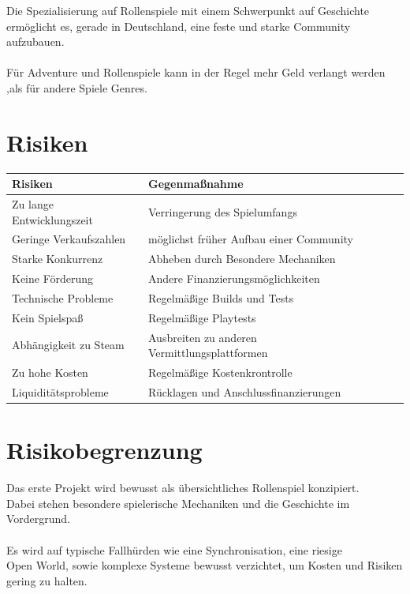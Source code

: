 \documentclass[envcountsame,envcountchap deutsch]{i-studis}
\begin{document}
Die Spezialisierung auf Rollenspiele mit einem Schwerpunkt auf Geschichte ermöglicht es, gerade in Deutschland, eine feste und starke Community aufzubauen. \\\\

Für Adventure und Rollenspiele kann in der Regel mehr Geld verlangt werden ,als für andere Spiele Genres.

\pagebreak
\section{Risiken}
\begin{table}[ht]
	\centering
	\begin{tabular}{|p{5cm}|p{8cm}|p{3cm}|p{3cm}|}
		\hline
		\textbf{Risiken}  & \textbf{Gegenmaßnahme}  \\ \hline
		Zu lange Entwicklungszeit  & Verringerung des Spielumfangs  \\ \hline
		Geringe Verkaufszahlen & möglichst früher Aufbau einer Community  \\ \hline
		Starke Konkurrenz  & Abheben durch Besondere Mechaniken\\ \hline
		Keine Förderung  & Andere Finanzierungsmöglichkeiten \\ \hline
		Technische Probleme  & Regelmäßige Builds und Tests\\ \hline
		Kein Spielspaß  & Regelmäßige Playtests\\ \hline
		Abhängigkeit zu Steam  & Ausbreiten zu anderen Vermittlungsplattformen\\ \hline
		Zu hohe Kosten  & Regelmäßige Kostenkrontrolle\\ \hline
		Liquiditätsprobleme  & Rücklagen und Anschlussfinanzierungen\\ \hline
	\end{tabular}
\end{table}

\section{Risikobegrenzung}

Das erste Projekt wird bewusst als übersichtliches Rollenspiel konzipiert.\\
Dabei stehen besondere spielerische Mechaniken und die Geschichte im Vordergrund.\\
\\
Es wird auf typische Fallhürden wie eine Synchronisation, eine riesige \\ Open World, sowie
komplexe Systeme bewusst verzichtet, um Kosten und Risiken gering zu halten.
\end{document}
